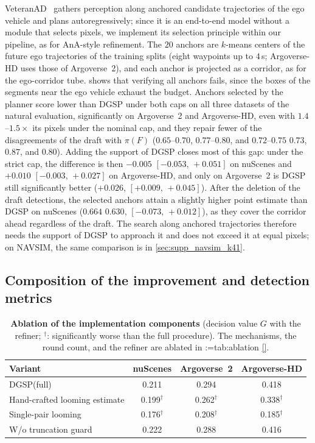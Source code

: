 \documentclass[10pt,letterpaper]{article}
\makeatletter
\newcommand{\method}{DGSP\xspace}
\newcommand{\full}{F}
\newcommand{\policy}{\pi}
\newcommand{\G}{G}
\newcommand{\ci}[2]{[#1,\allowbreak\,#2]}
\theoremstyle{remark}
\theoremstyle{plain}
\theoremstyle{definition}
\DeclareRobustCommand{\mref}[1]{\def\mref@list{}\@for\mref@i:=#1\do{\ifx\mref@list\@empty\edef\mref@list{M-\mref@i}\else\edef\mref@list{\mref@list,M-\mref@i}\fi}%
  \edef\mref@cmd{\noexpand\cref*{\mref@list}}\mref@cmd}
\makeatother
\begin{document}
VeteranAD~\cite{veteranad} gathers perception along anchored candidate trajectories of the ego vehicle and plans autoregressively; since it is an end-to-end model without a module that selects pixels, we implement its selection principle within our pipeline, as for AnA-style refinement.
The $20$ anchors are $k$-means centers of the future ego trajectories of the training splits (eight waypoints up to $4$\,s; Argoverse-HD uses those of Argoverse~2), and each anchor is projected as a corridor, as for the ego-corridor tube.
 shows that verifying all anchors fails, since the boxes of the segments near the ego vehicle exhaust the budget.
Anchors selected by the planner score lower than \method under both caps on all three datasets of the natural evaluation, significantly on Argoverse~2 and Argoverse-HD, even with $1.4$--$1.5\times$ its pixels under the nominal cap, and they repair fewer of the disagreements of the draft with $\policy(\full)$ ($0.65$--$0.70$, $0.77$--$0.80$, and $0.72$--$0.75$ \vs $0.73$, $0.87$, and $0.80$).
Adding the support of \method closes most of this gap: under the strict cap, the difference is then $-0.005$ $\ci{-0.053}{+0.051}$ on nuScenes and $+0.010$ $\ci{-0.003}{+0.027}$ on Argoverse-HD, and only on Argoverse~2 is \method still significantly better ($+0.026$, $\ci{+0.009}{+0.045}$).
After the deletion of the draft detections, the selected anchors attain a slightly higher point estimate than \method on nuScenes ($0.664$ \vs $0.630$, $\ci{-0.073}{+0.012}$), as they cover the corridor ahead regardless of the draft.
The search along anchored trajectories therefore needs the support of \method to approach it and does not exceed it at equal pixels; on NAVSIM, the same comparison is in \cref{sec:supp_navsim_k41}.

\subsection{Composition of the improvement and detection metrics}
\label{sec:supp_composition}

\begin{table}[!htbp]
\centering
\caption{\textbf{Ablation of the implementation components} (decision value $\G$ with the refiner; $^{\dagger}$: significantly worse than the full procedure). The mechanisms, the round count, and the refiner are ablated in \mref{tab:ablation}.}
\label{tab:ablation_impl}
\small
\begin{tabular}{@{}lccc@{}}
\toprule
Variant & nuScenes & Argoverse~2 & Argoverse-HD \\
\midrule
\method (full) & 0.211 & 0.294 & 0.418 \\
Hand-crafted looming estimate & 0.199$^{\dagger}$ & 0.262$^{\dagger}$ & 0.338$^{\dagger}$ \\
Single-pair looming & 0.176$^{\dagger}$ & 0.208$^{\dagger}$ & 0.185$^{\dagger}$ \\
W/o truncation guard & 0.222 & 0.288 & 0.416 \\
\bottomrule
\end{tabular}
\end{table}
\end{document}

